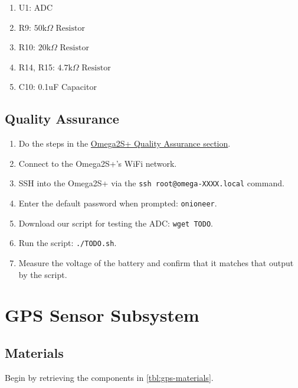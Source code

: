 \documentclass{article}
\newcommand{\resistor}[1]{$\text{#1} \Omega \text{ Resistor}$}
\begin{document}
\begin{enumerate}
  \item U1: ADC
  \item R9: \resistor{50k}
  \item R10: \resistor{20k}
  \item R14, R15: \resistor{4.7k}
  \item C10: 0.1uF Capacitor
\end{enumerate}

\subsection{Quality Assurance}

\begin{enumerate}
  \item Do the steps in the \hyperref[sec:qual-omega]{Omega2S+ Quality Assurance section}.
  \item Connect to the Omega2S+'s WiFi network.
  \item SSH into the Omega2S+ via the \texttt{ssh root@omega-XXXX.local} command.
  \item Enter the default password when prompted: \texttt{onioneer}.
  \item Download our script for testing the ADC: \texttt{wget TODO}.
  \item Run the script: \texttt{./TODO.sh}.
  \item Measure the voltage of the battery and confirm that it matches that output by the script.
\end{enumerate}

\section{GPS Sensor Subsystem}

\subsection{Materials}
Begin by retrieving the components in \autoref{tbl:gps-materials}.
\end{document}
